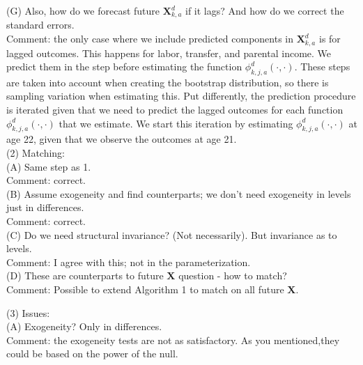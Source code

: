 \noindent (G) Also, how do we forecast future $ \bm{X}_{k,a}^d$ if it lags? And how do we correct the standard errors.\\
\noindent Comment: the only case where we include predicted components in $ \bm{X}_{k,a}^d$ is for lagged outcomes. This happens for labor, transfer, and parental income. We predict them in the step before estimating the function $\phi_{k,j,a}^d \left( \cdot, \cdot \right)$. These steps are taken into account when creating the bootstrap distribution, so there is sampling variation when estimating this. Put differently, the prediction procedure is iterated given that we need to predict the lagged outcomes for each function $\phi_{k,j,a}^d \left( \cdot, \cdot \right)$ that we estimate. We start this iteration by estimating $\phi_{k,j,a}^d \left( \cdot, \cdot \right)$ at age 22, given that we observe the outcomes at age 21.\\ 



\noindent (2) Matching:\\ 
\noindent (A) Same step as 1.\\
\noindent Comment: correct.\\

\noindent (B) Assume exogeneity and find counterparts; we don't need exogeneity in levels just in differences.\\
\noindent Comment: correct.\\

\noindent (C) Do we need structural invariance? (Not necessarily). But invariance as to levels.\\
\noindent Comment: I agree with this; not in the parameterization.\\

\noindent (D) These are counterparts to future $\bm{X}$ question - how to match?\\ 
\noindent Comment: Possible to extend Algorithm 1 to match on all future $\bm{X}$. 

\noindent (3) Issues:\\

\noindent (A) Exogeneity? Only in differences. \\
\noindent Comment: the exogeneity tests are not as satisfactory. As you mentioned,they could be based on the power of the null.\\

